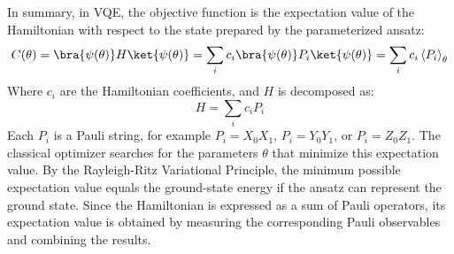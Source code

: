 \highspace
In summary, in VQE, the objective function is the expectation value of the Hamiltonian with respect to the state prepared by the parameterized ansatz:
\begin{equation*}
    C(\theta) = \bra{\psi(\theta)} H \ket{\psi(\theta)} = \sum_i c_i \bra{\psi(\theta)} P_i \ket{\psi(\theta)} = \sum_i c_i \left\langle P_i \right\rangle_{\theta}
\end{equation*}
Where $c_i$ are the Hamiltonian coefficients, and $H$ is decomposed as:
\begin{equation*}
    H = \sum_i c_i P_i
\end{equation*}
Each $P_i$ is a Pauli string, for example $P_i = X_0 X_1$, $P_i = Y_0 Y_1$, or $P_i = Z_0 Z_1$. The classical optimizer searches for the parameters $\theta$ that minimize this expectation value. By the Rayleigh-Ritz Variational Principle, the minimum possible expectation value equals the ground-state energy if the ansatz can represent the ground state. Since the Hamiltonian is expressed as a sum of Pauli operators, its expectation value is obtained by measuring the corresponding Pauli observables and combining the results.